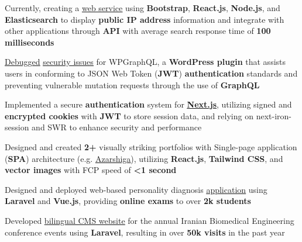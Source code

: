 \documentclass[10pt,A4]{article}
\newcommand{\cvlist}[1] {
  \begin{itemize}\small{#1}\end{itemize}
}
\begin{document}
\begin{paracol}{2}
\begin{rightcolumn}
{\cvlist{
         \item{
                Currently, creating a \href{https://publicipinfo.com}{\underline{web service}} using \textbf{Bootstrap}, \textbf{React.js}, \textbf{Node.js}, and \textbf{Elasticsearch} to display \textbf{public IP address} information and integrate with other applications through \textbf{API} with average search response time of \textbf{100 milliseconds}
          }
          \item{
                \href{https://github.com/wp-graphql/wp-graphql-jwt-authentication/pull/145}{\underline{Debugged}} \href{https://github.com/wp-graphql/wp-graphql-jwt-authentication/issues/144}{\underline{security issues}} for WPGraphQL, a \textbf{WordPress plugin} that assists users in conforming to JSON Web Token (\textbf{JWT}) \textbf{authentication} standards and preventing vulnerable mutation requests through the use of \textbf{GraphQL}
          }\item{
               Implemented a secure \textbf{authentication} system for \href{https://github.com/majhoolsoft/next.js/tree/majhoolsoft/examples/with-iron-session-and-jwt-auth}{\underline{\textbf{Next.js}}}, utilizing signed and \textbf{encrypted cookies} with \textbf{JWT} to store session data, and relying on next-iron-session and SWR to enhance security and performance
          }\item{
                Designed and created \textbf{2+} visually striking portfolios with Single-page application (\textbf{SPA}) architecture (e.g. \href{https://github.com/majhoolsoft/Next.js-SPA-Portfolio}{\underline{Azarshiga}}), utilizing \textbf{React.js}, \textbf{Tailwind CSS}, and \textbf{vector images} with FCP speed of \textbf{<1 second}
          }\item{
              Designed and deployed web-based personality diagnosis \href{https://github.com/majhoolsoft/Persoulio/tree/2018/MOCKS}{\underline{application}} using \textbf{Laravel} and \textbf{Vue.js}, providing \textbf{online exams} to over \textbf{2k students}
          }
          \item{
                Developed \href{https://icbme.ir/}{\underline{bilingual CMS website}} for the annual Iranian Biomedical Engineering conference events using \textbf{Laravel}, resulting in over \textbf{50k visits} in the past year
          }\item{
}}}
\end{rightcolumn}
\end{paracol}
\end{document}
